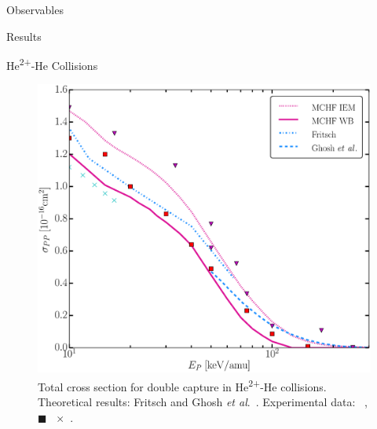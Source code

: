 \documentclass[letterpaper, 11 pt]{report}
\begin{document}
\begin{chapter}{Observables \label{chap:p-he2p-he}}
\begin{section}{Results \label{sec:phe2p-res}}
\begin{subsection}{\texorpdfstring{He\textsuperscript{2+}}{He2+}-He Collisions 
                         \label{sec:he2phe-res}}
         \begin{figure}[htp]
            \centering
            \includegraphics[width = 0.49\linewidth]{./images/he2phe/he2phe-PP.eps}
            \caption[Total cross section for double capture in He\textsuperscript{2+}-He
                     collisions.]{Total cross section for double capture in He\textsuperscript{2+}-He
                     collisions.
                     Theoretical results: Fritsch \cite{Fritsch-94} and Ghosh
                     \textit{et al}.~\cite{GDMP-08}.
                     Experimental data: {\color{RedViolet}{$\blacktriangledown$}}~\cite{Dubois87},
                     {\color{red}$\blacksquare$}~\cite{Rudd85}
                     {\color{TealBlue}$\times$}~\cite{SG74}. \label{fig:he2phe-pp}}
         \end{figure}


\end{subsection}
\end{section}
\end{chapter}
\end{document}
